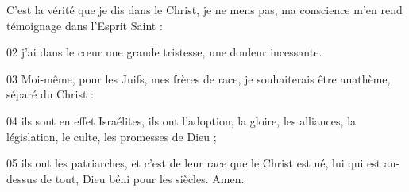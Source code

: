 C'est la vérité que je dis dans le Christ, je ne mens pas, ma conscience m'en rend témoignage dans l'Esprit Saint :

02 j’ai dans le cœur une grande tristesse, une douleur incessante.

03 Moi-même, pour les Juifs, mes frères de race, je souhaiterais être anathème, séparé du Christ :

04 ils sont en effet Israélites, ils ont l’adoption, la gloire, les alliances, la législation, le culte, les promesses de Dieu ;

05 ils ont les patriarches, et c’est de leur race que le Christ est né, lui qui est au-dessus de tout, Dieu béni pour les siècles. Amen.